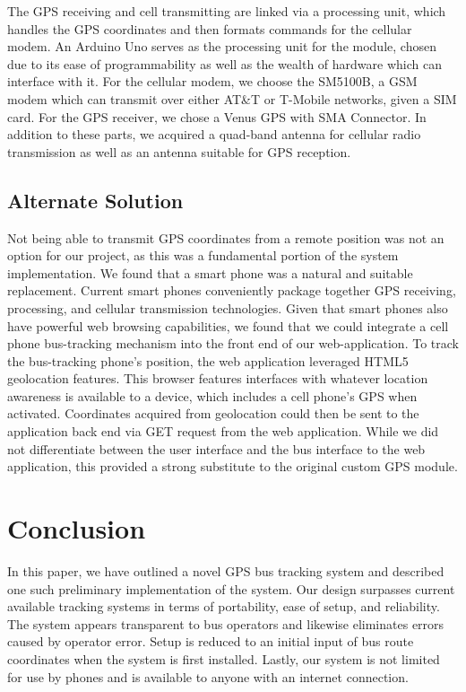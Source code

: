 \documentclass[pageno]{jpaper}
\begin{document}
The GPS receiving and cell transmitting are linked via a processing unit, 
which handles the GPS coordinates and then formats commands for the cellular 
modem. An Arduino Uno serves as the processing unit for the module, chosen due to 
its ease of programmability as well as the wealth of hardware which can interface 
with it. For the cellular modem, we choose the SM5100B, a GSM modem which can 
transmit over either AT\&T or T-Mobile networks, given a SIM card. For the GPS 
receiver, we chose a Venus GPS with SMA Connector. In addition to these parts, we 
acquired a quad-band antenna for cellular radio transmission as well as an antenna 
suitable for GPS reception.

\subsection{Alternate Solution}

Not being able to transmit GPS coordinates from a remote position was not
an option for our project, as this was a fundamental portion of the system 
implementation. We found that a smart phone was a natural and suitable 
replacement. Current smart phones conveniently package together GPS receiving, 
processing, and cellular transmission technologies. Given that smart phones also 
have powerful web browsing capabilities, we found that we could integrate a cell 
phone bus-tracking mechanism into the front end of our web-application. To track 
the bus-tracking phone’s position, the web application leveraged HTML5 
geolocation features. This browser features interfaces with whatever location 
awareness is available to a device, which includes a cell phone’s GPS when activated. 
Coordinates acquired from geolocation could then be sent to the application back 
end via GET request from the web application. While we did not differentiate 
between the user interface and the bus interface to the web application, this 
provided a strong substitute to the original custom GPS module.

\section {Conclusion}

In this paper, we have outlined a novel GPS bus tracking system and described 
one such preliminary implementation of the system.  Our design surpasses 
current available tracking systems in terms of portability, ease of setup, 
and reliability. The system appears transparent to bus operators and likewise 
eliminates errors caused by operator error.  Setup is reduced to an initial input 
of bus route coordinates when the system is first installed.  Lastly, our 
system is not limited for use by phones and is available to anyone with an 
internet connection.



\end{document}
